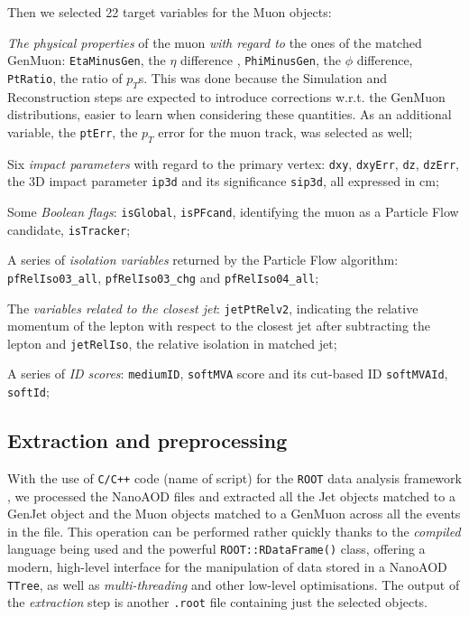 Then we selected 22 target variables for the Muon objects:

\begin{outline}
\1 \emph{The physical properties} of the muon \emph{with regard to} the ones of the matched GenMuon: \texttt{EtaMinusGen}, the $\eta$ difference , \texttt{PhiMinusGen}, the $\phi$ difference, \texttt{PtRatio}, the ratio of $p_T$s. This was done because the Simulation and Reconstruction steps are expected to introduce corrections w.r.t. the GenMuon distributions, easier to learn when considering these quantities. As an additional variable, the \texttt{ptErr}, the $p_T$ error for the muon track, was selected as well;

\1 Six \emph{impact parameters} with regard to the primary vertex: \texttt{dxy}, \texttt{dxyErr}, \texttt{dz}, \texttt{dzErr}, the 3D impact parameter \texttt{ip3d} and its significance \texttt{sip3d}, all expressed in cm;

\1 Some \emph{Boolean flags}: \texttt{isGlobal}, \texttt{isPFcand}, identifying the muon as a Particle Flow candidate, \texttt{isTracker};

\1 A series of \emph{isolation variables} returned by the Particle Flow algorithm: \texttt{pfRelIso03\_all}, \texttt{pfRelIso03\_chg} and \texttt{pfRelIso04\_all};

\1 The \emph{variables related to the closest jet}: \texttt{jetPtRelv2}, indicating the relative momentum of the lepton with respect to the closest jet after subtracting the lepton and \texttt{jetRelIso}, the relative isolation in matched jet;

\1 A series of \emph{ID scores}: \texttt{mediumID}, \texttt{softMVA} score and its cut-based ID \texttt{softMVAId}, \texttt{softId};
\end{outline}

\subsection{Extraction and preprocessing}

With the use of \texttt{C/C++} code (name of script) for the \texttt{ROOT} data analysis framework \cite{Brun:491486}, we processed the NanoAOD files and extracted all the Jet objects matched to a GenJet object and the Muon objects matched to a GenMuon across all the events in the file. This operation can be performed rather quickly thanks to the \emph{compiled} language being used and the powerful \texttt{ROOT::RDataFrame()} class, offering a modern, high-level interface for the manipulation of data stored in a NanoAOD \texttt{TTree}, as well as \emph{multi-threading} and other low-level optimisations.
The output of the \emph{extraction} step is another \texttt{.root} file containing just the selected objects.

